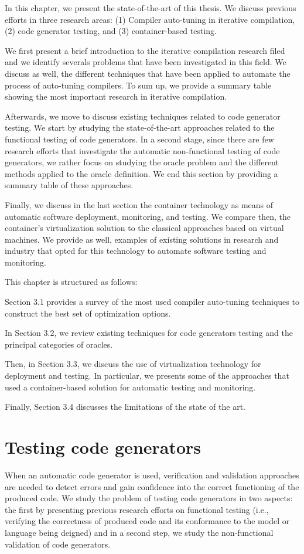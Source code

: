 
In this chapter, we present the state-of-the-art of this thesis. We discuss previous efforts in three research areas: (1) Compiler auto-tuning in iterative compilation, (2) code generator testing, and (3) container-based testing.

We first present a brief introduction to the iterative compilation research filed and we identify severals problems that have been investigated in this field. We discuss as well, the different techniques that have been applied to automate the process of auto-tuning compilers. To sum up, we provide a summary table showing the most important research in iterative compilation.

Afterwards, we move to discuss existing techniques related to code generator testing. We start by studying the state-of-the-art approaches related to the functional testing of code generators. In a second stage, since there are few research efforts that investigate the automatic non-functional testing of code generators, we rather focus on studying the oracle problem and the different methods applied to the oracle definition. We end this section by providing a summary table of these approaches.

Finally, we discuss in the last section the container technology as means of automatic software deployment, monitoring, and testing. We compare then, the container's virtualization solution to the classical approaches based on virtual machines. We provide as well, examples of existing solutions in research and industry that opted for this technology to automate software testing and monitoring.

This chapter is structured as follows: 

Section 3.1 provides a survey of the most used compiler auto-tuning techniques to construct the best set of optimization options. 

In Section 3.2, we review existing techniques for code generators testing and the principal categories of oracles. 

Then, in Section 3.3, we discuss the use of virtualization technology for deployment and testing. In particular, we presents some of the approaches that used a container-based solution for automatic testing and monitoring. 

Finally, Section 3.4 discusses the limitations of the state of the art.
\section{Testing code generators}
When an automatic code generator is used, verification and validation approaches are needed to detect errors and gain confidence into the correct functioning of the produced code. We study the problem of testing code generators in two aspects: the first by presenting previous research efforts on functional testing (i.e., verifying the correctness of produced code and its conformance to the model or language being deigned) and in a second step, we study the non-functional validation of code generators. 


